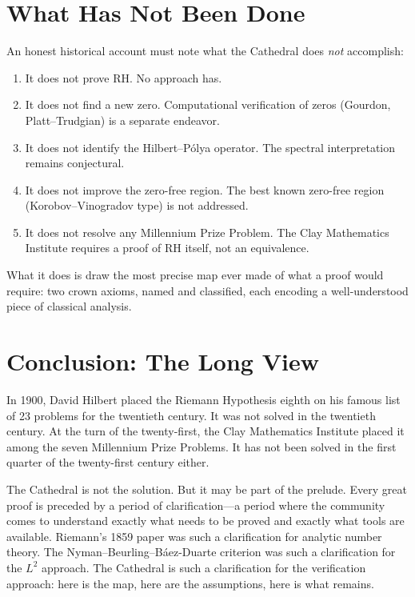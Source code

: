 \documentclass[11pt,a4paper]{article}
\begin{document}
\section{What Has Not Been Done}

An honest historical account must note what the Cathedral does
\emph{not} accomplish:

\begin{enumerate}
  \item It does not prove RH. No approach has.
  \item It does not find a new zero. Computational verification
    of zeros (Gourdon, Platt--Trudgian) is a separate endeavor.
  \item It does not identify the Hilbert--P\'olya operator. The
    spectral interpretation remains conjectural.
  \item It does not improve the zero-free region. The best known
    zero-free region (Korobov--Vinogradov type) is not addressed.
  \item It does not resolve any Millennium Prize Problem. The
    Clay Mathematics Institute requires a proof of RH itself,
    not an equivalence.
\end{enumerate}

What it does is draw the most precise map ever made of what a
proof would require: two crown axioms, named and classified, each
encoding a well-understood piece of classical analysis.

\section{Conclusion: The Long View}

In 1900, David Hilbert placed the Riemann Hypothesis eighth on
his famous list of 23 problems for the twentieth century. It
was not solved in the twentieth century. At the turn of the
twenty-first, the Clay Mathematics Institute placed it among the
seven Millennium Prize Problems. It has not been solved in the
first quarter of the twenty-first century either.

The Cathedral is not the solution. But it may be part of the
prelude. Every great proof is preceded by a period of
clarification---a period where the community comes to understand
exactly what needs to be proved and exactly what tools are
available. Riemann's 1859 paper was such a clarification for
analytic number theory. The Nyman--Beurling--B\'aez-Duarte
criterion was such a clarification for the $L^2$ approach. The
Cathedral is such a clarification for the verification approach:
here is the map, here are the assumptions, here is what remains.
\end{document}
